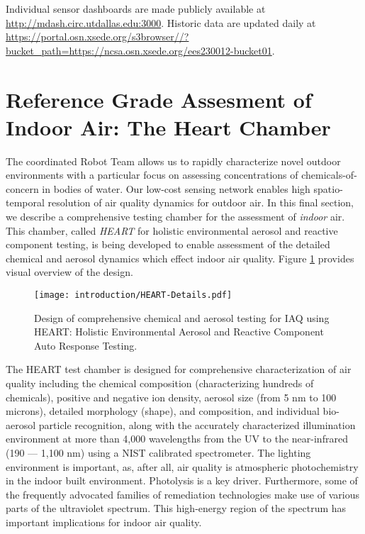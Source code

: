 Individual sensor dashboards are made publicly available at \url{http://mdash.circ.utdallas.edu:3000}. Historic data are updated daily at \url{https://portal.osn.xsede.org/s3browser//?bucket_path=https://ncsa.osn.xsede.org/ees230012-bucket01}.


\section{Reference Grade Assesment of Indoor Air: The Heart Chamber}

The coordinated Robot Team allows us to rapidly characterize novel outdoor environments with a particular focus on assessing concentrations of chemicals-of-concern in bodies of water. Our low-cost sensing network enables high spatio-temporal resolution of air quality dynamics for outdoor air. In this final section, we describe a comprehensive testing chamber for the assessment of \textit{indoor} air. This chamber, called \textit{HEART} for holistic environmental aerosol and reactive component testing, is being developed to enable assessment of the detailed chemical and aerosol dynamics which effect indoor air quality. Figure \ref{Figure.HEART-Details} provides visual overview of the design.

\begin{figure}[!hbt]
  \centering
  \texttt{[image: introduction/HEART-Details.pdf]}
	\caption{Design of comprehensive chemical and aerosol testing for IAQ using HEART: Holistic Environmental Aerosol and Reactive Component Auto Response Testing.}
	\label{Figure.HEART-Details}
\end{figure}

The HEART test chamber is designed for comprehensive characterization of air quality including the chemical composition (characterizing hundreds of chemicals), positive and negative ion density, aerosol size (from 5 nm to 100 microns), detailed morphology (shape), and composition, and individual bio-aerosol particle recognition, along with the accurately characterized illumination environment at more than 4,000 wavelengths from the UV to the near-infrared (190 — 1,100 nm) using a NIST calibrated spectrometer. The lighting environment is important, as, after all, air quality is atmospheric photochemistry in the indoor built environment. Photolysis is a key driver. Furthermore, some of the frequently advocated families of remediation technologies make use of various parts of the ultraviolet spectrum. This high-energy region of the spectrum has important implications for indoor air quality.

